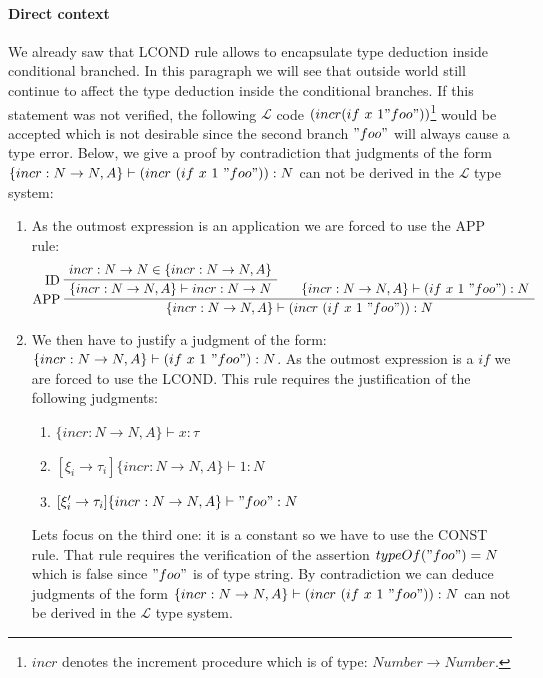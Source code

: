 \documentclass[a4paper]{report}
\newcommand{\lang}[0]{\mathcal{L}}
\newcommand{\ax}[1]%
{\AxiomC{$#1$}}
\newcommand{\unc}[1]%
{\UnaryInfC{$#1$}}
\newcommand{\bic}[1]%
{\BinaryInfC{$#1$}}
\newcommand{\drule}%
{\DisplayProof}
\begin{document}
\paragraph{Direct context} We already saw that LCOND rule allows to encapsulate type deduction inside conditional branched. In this paragraph we will see that outside world still continue to affect the type deduction inside the conditional branches. If this statement was not verified, the following $\lang$ code $(incr (if\ x\ 1 "foo"))$\footnote{$incr$ denotes the increment procedure which is of type: $Number\to Number$.} would be accepted which is not desirable since the second branch $"foo"$ will always cause a type error. Below, we give a proof by contradiction that judgments of the form $\{incr:N\to N,A\}\vdash (incr\ (if\ x\ 1\ "foo")):N$ can not be derived in the $\lang$ type system:
\begin{enumerate}
\item As the outmost expression is an application we are forced to use the APP rule:
$$\ax{incr:N\to N\in\{incr:N\to N,A\}}
\LeftLabel{ID}
\unc{\{incr:N\to N,A\}\vdash incr:N\to N}
\ax{\{incr:N\to N,A\}\vdash (if\ x\ 1\ "foo"):N}
\LeftLabel{APP}
\bic{\{incr:N\to N,A\}\vdash (incr\ (if\ x\ 1\ "foo")):N}
\drule$$
\item We then have to justify a judgment of the form: $\{incr:N\to N,A\}\vdash (if\ x\ 1\ "foo"):N$. As the outmost expression is a $if$ we are forced to use the LCOND. This rule requires the justification of the following judgments:
\begin{enumerate}
\item $\{incr:N\to N,A\}\vdash x:\tau$
\item $[\xi_i\to\tau_i]\{incr:N\to N, A\}\vdash 1:N$
\item $[\xi_i'\to\tau_i]\{incr:N\to N,A\}\vdash "foo":N$
\end{enumerate}
Lets focus on the third one: it is a constant so we have to use the CONST rule. That rule requires the verification of the assertion $typeOf("foo")=N$ which is false since $"foo"$ is of type string. By contradiction we can deduce judgments of the form $\{incr:N\to N,A\}\vdash (incr\ (if\ x\ 1\ "foo")):N$ can not be derived in the $\lang$ type system.
\end{enumerate}
\end{document}
